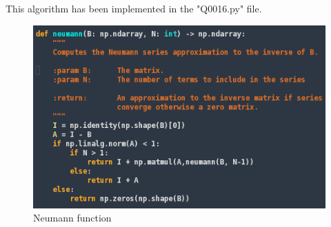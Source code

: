 This algorithm has been implemented in the "Q0016.py" file.
\begin{figure}[ht]
  \includegraphics[width=1\linewidth]{neumann}
  \caption{Neumann function}
\end{figure}
